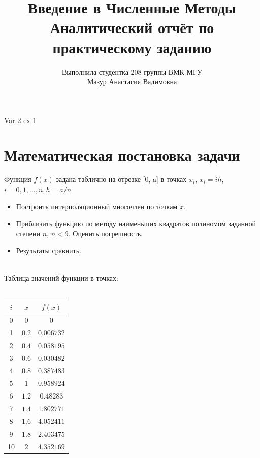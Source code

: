 \documentclass[a4paper, 14pt]{extreport}
\title{{\textbf{Введение в Численные Методы\\ Аналитический отчёт по практическому заданию}}}
\author{Выполнила студентка 208 группы ВМК МГУ\\ Мазур Анастасия Вадимовна}
\date{}
\begin{document}
\maketitle

\begin{center}
    Var 2 ex 1
\end{center}

\section*{Математическая постановка задачи}

Функция $f(x)$  задана таблично на отрезке [0, a] в точках $x_{i}$, $x_{i} = ih$, \\
$i = 0, 1, ..., n, h = a / n$

\begin{itemize}
\item{Построить интерполяционный многочлен по точкам $x$.} 
\item{Приблизить функцию по методу наименьших квадратов  полиномом   заданной степени $n$, $n < 9$. Оценить погрешность.} 
\item{Результаты сравнить.}
\end{itemize}

\\
Таблица значений функции в точках: \\ \\
\indent\begin{tabular}{|c|c|c|} 
    \hline\( i \) & \( x \) & \( f(x) \) \\ 
    \hline 0 & 0 & 0 \\ 
    \hline 1 & \( 0.2 \) & \( 0.006732 \) \\ 
    \hline 2 & \( 0.4 \) & \( 0.058195 \) \\ 
    \hline 3 & \( 0.6 \) & \( 0.030482 \) \\ 
    \hline 4 & \( 0.8 \) & \( 0.387483 \) \\ 
    \hline 5 & \( 1 \) & \( 0.958924 \) \\ 
    \hline 6 & \( 1.2 \) & \( 0.48283 \) \\
    \hline 7 & \( 1.4 \) & \( 1.802771 \) \\ 
    \hline 8 & \( 1.6 \) & \( 4.052411 \) \\
    \hline 9 & \( 1.8 \) & \( 2.403475 \) \\
    \hline 10 & \( 2 \) & \( 4.352169 \) \\
    \hline
\end{tabular}
\end{document}
